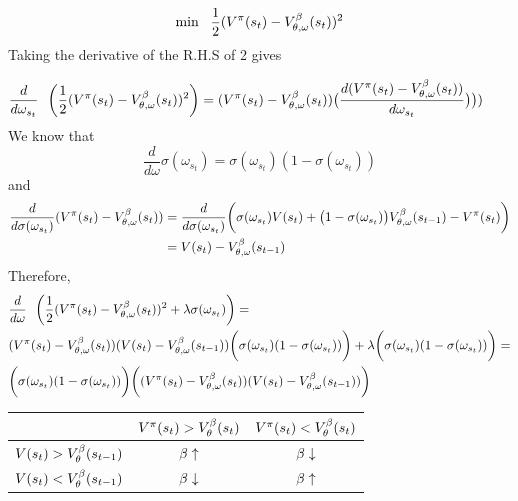 \begin{align}
    \min \ \ \frac{1}{2}(V^{\pi}(s_t) - V^{\beta}_{\theta,\omega}(s_t))^2  \\
\end{align}
Taking the derivative of the R.H.S of 2 gives

\begin{align}
    \frac{d}{d\omega_{s_t}} \ \ &\bigg( \frac{1}{2}(V^{\pol}(s_t) - \vrb(s_t))^2  \bigg) =(V^{\pol}(s_t) - \vrb(s_t)) \big(\frac{d (V^{\pol}(s_t) - \vrb(s_t))}{d\omega_{s_t}} \big) 
     \big) )  \ \ \ 
\end{align}
We know that 
\begin{equation}
\frac{d}{d\omega} \sigma(\omega_{s_t})=\sigma(\omega_{s_t})(1 - \sigma(\omega_{s_t}))
\end{equation}
and 
\begin{equation}
\begin{split}
	\frac{d}{d\sigma(\omega_{s_t})} (V^{\pi}(s_t) - V^{\beta}_{\theta,\omega}(s_t)) &= \frac{d}{d\sigma(\omega_{s_t})} \bigg(\sigma(\omega_{s_t})V(s_t) + \big(1 - \sigma(\omega_{s_t})\big)V^{\beta}_{\theta,\omega}(s_{t-1}) - V^{\pi}(s_t)\bigg)\\
	 &= V(s_t) - V^{\beta}_{\theta,\omega}(s_{t-1})
\end{split}
\end{equation}
Therefore, 
\begin{align}
    &\frac{d}{d\omega} \ \ \bigg( \frac{1}{2}(V^{\pi}(s_t) - V^{\beta}_{\theta,\omega}(s_t))^2 + \lambda \sigma(\omega_{s_t}) \bigg) =\\
    &(V^{\pi}(s_t) - V^{\beta}_{\theta,\omega}(s_t)) (V(s_t) - V^{\beta}_{\theta,\omega}(s_{t-1}))\bigg(\sigma(\omega_{s_t})(1 - \sigma(\omega_{s_t}))\bigg)
     + \lambda \bigg(\sigma(\omega_{s_t})(1 - \sigma(\omega_{s_t}))\bigg)  = \\
     &\bigg(\sigma(\omega_{s_t})(1 - \sigma(\omega_{s_t}))\bigg) \bigg((V^{\pi}(s_t) - V^{\beta}_{\theta,\omega}(s_t))(V(s_t) - V^{\beta}_{\theta,\omega}(s_{t-1})) \bigg)
\end{align}
\begin{table}
\begin{center}
\begin{tabular}{ c|c c } 
  & \small{$V^{\pi}(s_t)>V^{\beta}_{\theta}(s_t)$} & \small{$V^{\pi}(s_t)<V^{\beta}_{\theta}(s_t)$} \\ 
   \hline
 \small{$V(s_t)>V^{\beta}_{\theta}(s_{t-1})$} & $\beta \uparrow$ &  $\beta \downarrow$ \\ 
 \small{$V(s_t)<V^{\beta}_{\theta}(s_{t-1})$} & $\beta \downarrow$ & $\beta \uparrow$  \\ 
\end{tabular}
\end{center}
\end{table}
